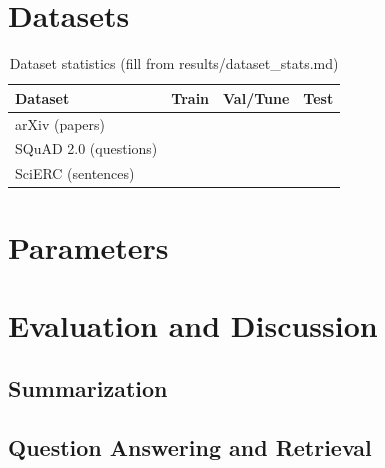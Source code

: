 \documentclass[conference]{IEEEtran}
\begin{document}
\section{Datasets}
\begin{table}[t]
\caption{Dataset statistics (fill from results/dataset_stats.md)}
\centering
\begin{tabular}{lrrr}
\toprule
Dataset & Train & Val/Tune & Test \\
\midrule
arXiv (papers) & & & \\
SQuAD 2.0 (questions) & & & \\
SciERC (sentences) & & & \\
\bottomrule
\end{tabular}
\end{table}

\section{Parameters}

\section{Evaluation and Discussion}
\subsection{Summarization}
\subsection{Question Answering and Retrieval}
\end{document}
